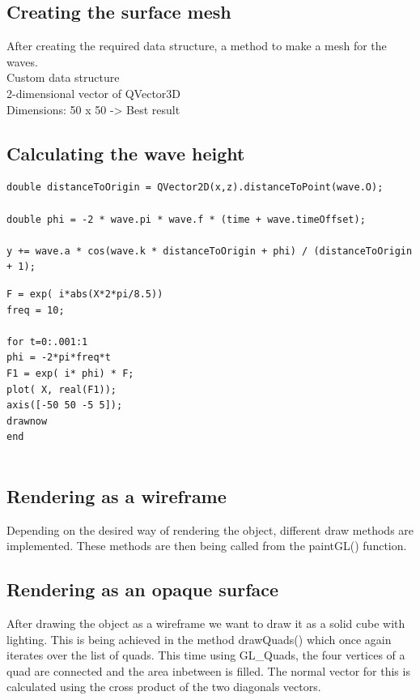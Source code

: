 \documentclass[12pt,a4paper]{scrartcl}
\begin{document}
\subsection{Creating the surface mesh}
After creating the required data structure, a method to make a mesh for the waves.\\
Custom data structure\\
2-dimensional vector of QVector3D\\
Dimensions: 50 x 50 -> Best result\\

\subsection{Calculating the wave height}
\begin{lstlisting}[language=PSEUDO]
double distanceToOrigin = QVector2D(x,z).distanceToPoint(wave.O);

double phi = -2 * wave.pi * wave.f * (time + wave.timeOffset);

y += wave.a * cos(wave.k * distanceToOrigin + phi) / (distanceToOrigin + 1);

\end{lstlisting}


\begin{lstlisting}[language=PSEUDO]
F = exp( i*abs(X*2*pi/8.5))
freq = 10;

for t=0:.001:1
phi = -2*pi*freq*t
F1 = exp( i* phi) * F;
plot( X, real(F1));
axis([-50 50 -5 5]);
drawnow
end


\end{lstlisting}


\subsection{Rendering as a wireframe}
Depending on the desired way of rendering the object, different draw methods are implemented. These methods are then being called from the paintGL() function.

\subsection{Rendering as an opaque surface}
After drawing the object as a wireframe we want to draw it as a solid cube with lighting. This is being achieved in the method drawQuads() which once again iterates over the list of quads. This time using GL_Quads, the four vertices of a quad are connected and the area inbetween is filled. The normal vector for this is calculated using the cross product of the two diagonals vectors.
\end{document}
